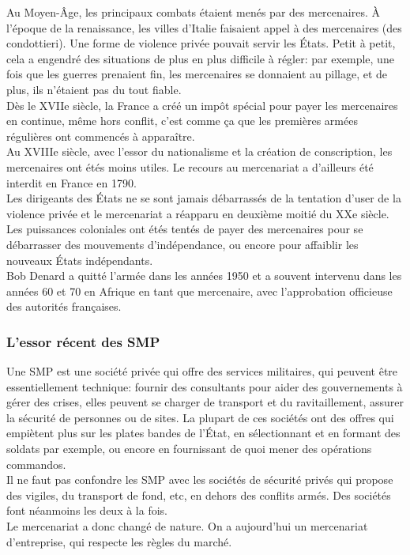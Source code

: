\documentclass[10pt, a4paper, openany]{book}
\begin{document}
Au Moyen-Âge, les principaux combats étaient menés par des mercenaires. À l'époque de la renaissance, les villes d'Italie faisaient appel à des mercenaires (des condottieri). Une forme de violence privée pouvait servir les États. Petit à petit, cela a engendré des situations de plus en plus difficile à régler: par exemple, une fois que les guerres prenaient fin, les mercenaires se donnaient au pillage, et de plus, ils n'étaient pas du tout fiable. \\
Dès le XVIIe siècle, la France a créé un impôt spécial pour payer les mercenaires en continue, même hors conflit, c'est comme ça que les premières armées régulières ont commencés à apparaître. \\
Au XVIIIe siècle, avec l'essor du nationalisme et la création de conscription, les mercenaires ont étés moins utiles. Le recours au mercenariat a d'ailleurs été interdit en France en 1790. \\
Les dirigeants des États ne se sont jamais débarrassés de la tentation d'user de la violence privée et le mercenariat a réapparu en deuxième moitié du XXe siècle. Les puissances coloniales ont étés tentés de payer des mercenaires pour se débarrasser des mouvements d'indépendance, ou encore pour affaiblir les nouveaux États indépendants. \\
Bob Denard a quitté l'armée dans les années 1950 et a souvent intervenu dans les années 60 et 70 en Afrique en tant que mercenaire, avec l'approbation officieuse des autorités françaises. 

\subsubsection{L'essor récent des SMP}

Une SMP est une société privée qui offre des services militaires, qui peuvent être essentiellement technique: fournir des consultants pour aider des gouvernements à gérer des crises, elles peuvent se charger de transport et du ravitaillement, assurer la sécurité de personnes ou de sites. La plupart de ces sociétés ont des offres qui empiètent plus sur les plates bandes de l'État, en sélectionnant et en formant des soldats par exemple, ou encore en fournissant de quoi mener des opérations commandos. \\
Il ne faut pas confondre les SMP avec les sociétés de sécurité privés qui propose des vigiles, du transport de fond, etc, en dehors des conflits armés. Des sociétés font néanmoins les deux à la fois. \\
Le mercenariat a donc changé de nature. On a aujourd'hui un mercenariat d'entreprise, qui respecte les règles du marché.
\end{document}
